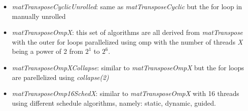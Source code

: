 \documentclass[conference]{IEEEtran}
\begin{document}
\begin{itemize}
\item \textit{matTransposeCyclicUnrolled}: same as \textit{matTransposeCyclic} but the for loop in manually unrolled
\iffalse
  \begin{algorithm}
    \caption{matTranspose cyclic unrolled}\label{matTransposeCyclicUnrolled}
    \begin{algorithmic}[1]
      \Procedure{matTransposeCyclicUnrolled}{$Matrix input, Matrix output, int size$}
        \For{\textit{n} \textbf{ in } \textit{0..size*size-1}}
        \State $T[n] \gets M[size * ((n+1) \mod size ) + (\frac{n}{size})]$
        \State $T[n+1] \gets M[size * ((n+1+1) \mod size ) + (\frac{n+1}{size})]$
        \State $T[n+2] \gets M[size * ((n+2+1) \mod size ) + (\frac{n+2}{size})]$
        \State $T[n+3] \gets M[size * ((n+3+1) \mod size ) + (\frac{n+3}{size})]$
        \EndFor
      \EndProcedure
    \end{algorithmic}
  \end{algorithm}
  \fi
\item \textit{matTransposeOmpX}: this set of algorithms are all derived from \textit{matTranspose} with the outer for loops parallelized using omp with the number of threads \textit{X} being a power of 2 from $2^1$ to $2^6$.

\item \textit{matTransposeOmpXCollapse}: similar to \textit{matTransposeOmpX} but the for loops are parellelized using \textit{collapse(2)}
  
\item \textit{matTransposeOmp16SchedX}: similar to \textit{matTransposeOmpX} with 16 threads using different schedule algorithms, namely: static, dynamic, guided.
\end{itemize}
\end{document}
